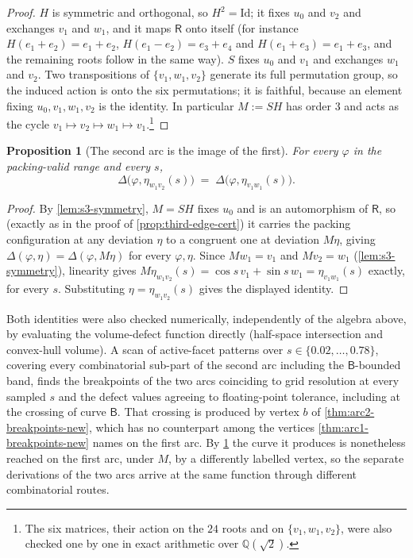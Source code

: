 \documentclass[11pt,reqno]{amsart}
\renewcommand{\_}{\origunderscore\allowbreak}
\numberwithin{equation}{section}
\theoremstyle{plain}
\newtheorem{prop}[thm]{Proposition}
\theoremstyle{definition}
\theoremstyle{remark}
\newcommand{\Rt}{\mathsf{R}}                 %
\newcommand{\tilt}{\varphi}                  %
\newcommand{\arcp}{s}                        %
\newcommand{\dev}{\eta}                      %
\newcommand{\defect}{\Delta}                 %
\begin{document}
\begin{proof}
$H$ is symmetric and orthogonal, so $H^2=\mathrm{Id}$; it fixes $u_0$
and $v_2$ and exchanges $v_1$ and $w_1$, and it maps $\Rt$ onto itself
(for instance $H(e_1+e_2)=e_1+e_2$, $H(e_1-e_2)=e_3+e_4$ and
$H(e_1+e_3)=e_1+e_3$, and the remaining roots follow in the same way).
$S$ fixes $u_0$ and $v_1$ and exchanges $w_1$ and $v_2$. Two
transpositions of $\{v_1,w_1,v_2\}$ generate its full permutation group,
so the induced action is onto the six permutations; it is faithful,
because an element fixing $u_0,v_1,w_1,v_2$ is the identity. In
particular $M:=SH$ has order $3$ and acts as the cycle
$v_1\mapsto v_2\mapsto w_1\mapsto v_1$.\footnote{The six matrices, their
action on the $24$ roots and on $\{v_1,w_1,v_2\}$, were also checked one
by one in exact arithmetic over $\mathbb{Q}(\sqrt2)$.}
\end{proof}

\begin{prop}[The second arc is the image of the first]\label{prop:arc2-is-arc1}
For every $\tilt$ in the packing-valid range and every $\arcp$,
\[
  \defect\bigl(\tilt,\dev_{w_1v_2}(\arcp)\bigr) \;=\;
  \defect\bigl(\tilt,\dev_{v_1w_1}(\arcp)\bigr).
\]
\end{prop}

\begin{proof}
By \cref{lem:s3-symmetry}, $M=SH$ fixes $u_0$ and is an automorphism of
$\Rt$, so (exactly as in the proof of \cref{prop:third-edge-cert}) it
carries the packing configuration at any deviation $\eta$ to a
congruent one at deviation $M\eta$, giving
$\defect(\tilt,\eta)=\defect(\tilt,M\eta)$ for every $\tilt,\eta$. Since
$Mw_1=v_1$ and $Mv_2=w_1$ (\cref{lem:s3-symmetry}), linearity gives
$M\dev_{w_1v_2}(\arcp)=\cos\arcp\,v_1+\sin\arcp\,w_1=\dev_{v_1w_1}(\arcp)$
exactly, for every $\arcp$. Substituting $\eta=\dev_{w_1v_2}(\arcp)$
gives the displayed identity.
\end{proof}

Both identities were also checked numerically, independently of the
algebra above, by evaluating the volume-defect function directly
(half-space intersection and convex-hull volume). A scan of active-facet
patterns over $\arcp\in\{0.02,\dots,0.78\}$, covering every
combinatorial sub-part of the second arc including the
$\mathsf B$-bounded band, finds the breakpoints of the two arcs
coinciding to grid resolution at every sampled $\arcp$ and the defect
values agreeing to floating-point tolerance, including at the crossing of
curve $\mathsf B$. That crossing is produced by vertex $b$ of
\cref{thm:arc2-breakpoints-new}, which has no counterpart among the
vertices \cref{thm:arc1-breakpoints-new} names on the first arc. By
\cref{prop:arc2-is-arc1} the curve it produces is nonetheless reached on
the first arc, under $M$, by a differently labelled vertex, so the
separate derivations of the two arcs arrive at the same function through
different combinatorial routes.
\end{document}
